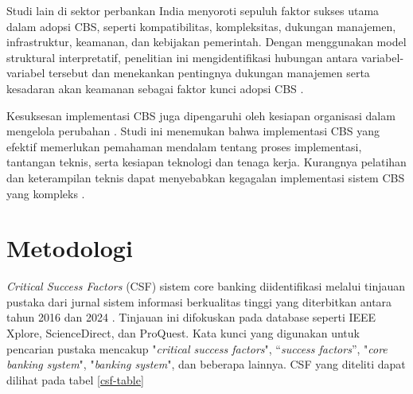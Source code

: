 \documentclass[journal,article,submit,pdftex,moreauthors]{Definitions/mdpi}
\begin{document}
Studi lain \cite{salu-csf} di sektor perbankan India menyoroti sepuluh faktor sukses utama dalam adopsi CBS, seperti kompatibilitas, kompleksitas, dukungan manajemen, infrastruktur, keamanan, dan kebijakan pemerintah. Dengan menggunakan model struktural interpretatif, penelitian ini mengidentifikasi hubungan antara variabel-variabel tersebut dan menekankan pentingnya dukungan manajemen serta kesadaran akan keamanan sebagai faktor kunci adopsi CBS \cite{salu-csf}.

Kesuksesan implementasi CBS juga dipengaruhi oleh kesiapan organisasi dalam mengelola perubahan \cite{johny-csf}. Studi ini menemukan bahwa implementasi CBS yang efektif memerlukan pemahaman mendalam tentang proses implementasi, tantangan teknis, serta kesiapan teknologi dan tenaga kerja. Kurangnya pelatihan dan keterampilan teknis dapat menyebabkan kegagalan implementasi sistem CBS yang kompleks \cite{johny-csf}.




\section{Metodologi}





\textit{Critical Success Factors} (CSF) sistem core banking diidentifikasi melalui tinjauan pustaka dari jurnal sistem informasi berkualitas tinggi yang diterbitkan antara tahun 2016 dan 2024 \cite{Ghafari-csf} \cite{falisat-csf} \cite{salu-csf} \cite{johny-csf}. Tinjauan ini difokuskan pada database seperti IEEE Xplore, ScienceDirect, dan ProQuest. Kata kunci yang digunakan untuk pencarian pustaka mencakup "\textit{critical success factors}", “\textit{success factors}”, "\textit{core banking system}", "\textit{banking system}", dan beberapa lainnya. CSF yang diteliti dapat dilihat pada tabel \ref{csf-table}
\end{document}
